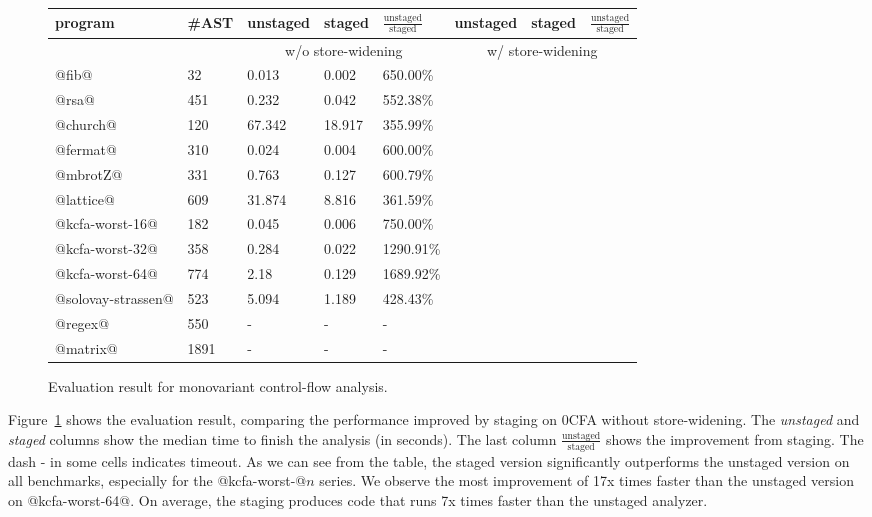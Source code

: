 \begin{figure}[h]
\footnotesize
\begin{tabular}{@{}ll|lll|lll@{}}
\toprule
    program             &\#AST & unstaged   & staged     & $\frac{\text{unstaged}}{\text{staged}}$ & unstaged   & staged    & $\frac{\text{unstaged}}{\text{staged}}$  \\ 
    \midrule
                        &      & \multicolumn{3}{c}{w/o store-widening} &  \multicolumn{3}{c}{w/ store-widening}  \\
    \midrule
    @fib@               & 32   & 0.013      & 0.002      & 650.00\%  & & &        \\
    @rsa@               & 451  & 0.232      & 0.042      & 552.38\%  & & &        \\
    @church@            & 120  & 67.342     & 18.917     & 355.99\%  & & &        \\
    @fermat@            & 310  & 0.024      & 0.004      & 600.00\%  & & &        \\
    @mbrotZ@            & 331  & 0.763      & 0.127      & 600.79\%  & & &        \\
    @lattice@           & 609  & 31.874     & 8.816      & 361.59\%  & & &       \\
    @kcfa-worst-16@     & 182  & 0.045      & 0.006      & 750.00\%  & & &      \\
    @kcfa-worst-32@     & 358  & 0.284      & 0.022      & 1290.91\% & & &      \\
    @kcfa-worst-64@     & 774  & 2.18       & 0.129      & 1689.92\% & & &      \\
    @solovay-strassen@  & 523  & 5.094      & 1.189      & 428.43\%  & & &       \\
    @regex@             & 550  & -          & -          & -         & & &       \\
    @matrix@            & 1891 & -          & -          & -         & & &       \\
    \bottomrule
\end{tabular}
\caption{Evaluation result for monovariant control-flow analysis.} \label{evaluation_result}
\end{figure}

Figure~\ref{evaluation_result} shows the evaluation result, comparing the
performance improved by staging on 0CFA without store-widening. The
\textit{unstaged} and \textit{staged} columns show the median time to finish the
analysis (in seconds). The last column $\frac{\text{unstaged}}{\text{staged}}$
shows the improvement from staging. The dash - in some cells indicates timeout.
As we can see from the table, the staged version significantly outperforms the
unstaged version on all benchmarks, especially for the @kcfa-worst-@$n$ series.
We observe the most improvement of 17x times faster than the unstaged version on
@kcfa-worst-64@. On average, the staging produces code that runs 7x times faster
than the unstaged analyzer.


